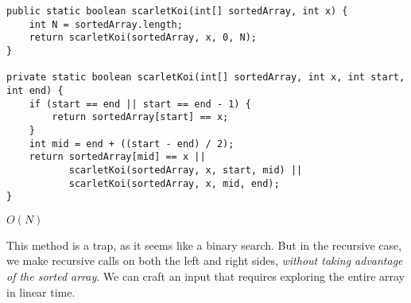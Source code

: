 \question
\begin{lstlisting}
public static boolean scarletKoi(int[] sortedArray, int x) {
    int N = sortedArray.length;
    return scarletKoi(sortedArray, x, 0, N);
}

private static boolean scarletKoi(int[] sortedArray, int x, int start, int end) {
    if (start == end || start == end - 1) {
        return sortedArray[start] == x;
    }
    int mid = end + ((start - end) / 2);
    return sortedArray[mid] == x ||
           scarletKoi(sortedArray, x, start, mid) ||
           scarletKoi(sortedArray, x, mid, end);
}
\end{lstlisting}
\begin{solution}[0.25in]
$O(N)$

This method is a trap, as it seems like a binary search. But in the recursive case, we make recursive calls on both the left and right sides, \textit{without taking advantage of the sorted array}. We can craft an input that requires exploring the entire array in linear time.
\end{solution}